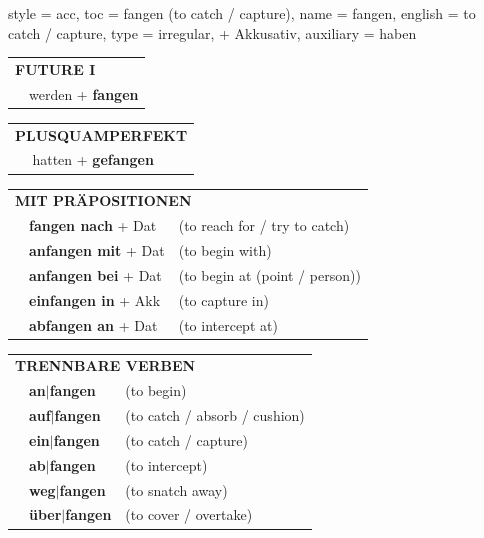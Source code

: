 \begin{verbentry}{
  style = {acc},
  toc = {fangen (to catch / capture)},
  name = {fangen},
  english = {to catch / capture},
  type = {irregular, + Akkusativ},
  auxiliary = {haben}
}
\begin{tabular}{rl}
    \multicolumn{2}{l}{\textbf{FUTURE I} }\\
  &  werden + \textbf{fangen}\\
 
  \end{tabular}
\hfill
   \begin{tabular}{rl}
      \multicolumn{2}{l}{\textbf{PLUSQUAMPERFEKT}}\\
  &  hatten + \textbf{gefangen}\\
  \end{tabular}
  
  \vspace{10pt}

   \begin{tabular}{lll}
      \multicolumn{3}{l}{\textbf{MIT PRÄPOSITIONEN}}\\
      & \textbf{fangen nach} + Dat & (to reach for / try to catch)\\
&\textbf{anfangen mit} + Dat & (to begin with)\\
&\textbf{anfangen bei} + Dat & (to begin at (point / person))\\
& \textbf{einfangen in} + Akk & (to capture in)\\
& \textbf{abfangen an} + Dat & (to intercept at)
  \end{tabular}
  \hfill
   \begin{tabular}{lll}
      \multicolumn{3}{l}{\textbf{TRENNBARE VERBEN}}\\
 & \textbf{an$|$fangen} & (to begin)\\
 & \textbf{auf$|$fangen} & (to catch / absorb / cushion)\\
 & \textbf{ein$|$fangen} & (to catch / capture)\\
  & \textbf{ab$|$fangen} & (to intercept)\\
  & \textbf{weg$|$fangen} & (to snatch away)\\
  & \textbf{über$|$fangen} & (to cover / overtake)
  \end{tabular}


  \vspace{-5pt}
\end{verbentry}


